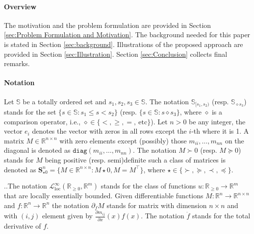 \documentclass[10pt,twocolumn,twoside]{IEEEtran}
\newcounter{para}
\newcommand\mypara{\par \thesection.\refstepcounter{para}\thepara.\space}
\theoremstyle{plain}
\theoremstyle{definition}
\theoremstyle{remark}
\begin{document}
\paragraph{Overview} The motivation and the problem formulation are provided in Section \ref{sec:Problem Formulation and Motivation}. The background needed for this paper is stated in Section \ref{sec:background}. Illustrations of the proposed approach are provided in Section \ref{sec:Illustration}. Section \ref{sec:Conclusion} collects final remarks.

\paragraph{Notation} Let $\mathbb{S}$ be a totally ordered set and $s_1,s_2,s_3\in\mathbb{S}$. The notation $\mathbb{S}_{[s_1,s_2)}$ (resp. $\mathbb{S}_{\diamond s_3}$) stands for the set $\{s\in\mathbb{S}:s_1\leq s< s_2\}$ (resp. $\{s\in\mathbb{S}:s\diamond s_3\}$, where $\diamond$ is a comparison operator, i.e., $\diamond\in\{<,\geq,=,\ \text{etc}\}$). Let $n>0$ be any integer, the vector $e_i$ denotes the vector with zeros in all rows except the $i$-th where it is 1. A matrix $M\in\mathbb{R}^{n\times n}$ with zero elements except (possibly) those  $m_{ii},\ldots,m_{nn}$ on the diagonal is denoted as $\mathbin{\mathtt{diag}}(m_{ii},\ldots,m_{nn})$. The notation $M\succ 0$ (resp. $M\succeq 0$) stands for $M$ being positive (resp. semi)definite such a class of matrices is denoted as $\mathbf{S}_{\star0}^n=\{M\in\mathbb{R}^{n\times n}:M\star0,M=M^\top\}$, where $\star\in\{\succ,\succeq,\prec,\preceq\}$. 

\mypara The notation $\mathcal{L}_{\mathrm{loc}}^\infty(\mathbb{R}_{\geq0},\mathbb{R}^m)$ stands for the class of functions $u:\mathbb{R}_{\geq0}\to\mathbb{R}^m$ that are locally essentially bounded. Given differentiable functions $M:\mathbb{R}^n\to\mathbb{R}^{n\times n}$ and $f:\mathbb{R}^n\to\mathbb{R}^n$ the notation $\partial_fM$ stands for matrix with dimension $n\times n$ and with $(i,j)$ element given by $\frac{\partial m_{ij}}{\partial x}(x)f(x)$. The notation $\dot{f}$ stands for the total derivative of $f$.
\end{document}
